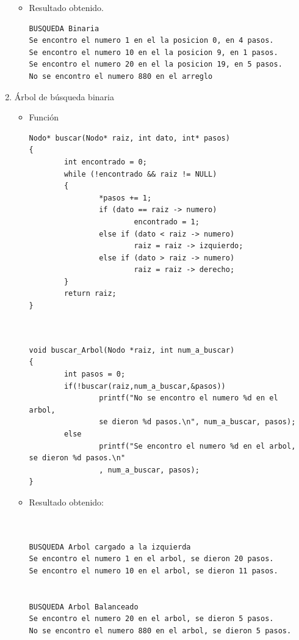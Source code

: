 \documentclass[a4paper,12pt]{article}
\begin{document}
\begin{enumerate}
\begin{itemize}
\item Resultado obtenido.

\begin{lstlisting}
BUSQUEDA Binaria
Se encontro el numero 1 en el la posicion 0, en 4 pasos.
Se encontro el numero 10 en el la posicion 9, en 1 pasos.
Se encontro el numero 20 en el la posicion 19, en 5 pasos.
No se encontro el numero 880 en el arreglo
\end{lstlisting}

\end{itemize}
\item Árbol de búsqueda binaria

\begin{itemize}
\item Función 

\begin{lstlisting}
Nodo* buscar(Nodo* raiz, int dato, int* pasos)
{
        int encontrado = 0;
        while (!encontrado && raiz != NULL)
        {
                *pasos += 1;
                if (dato == raiz -> numero)
                        encontrado = 1;
                else if (dato < raiz -> numero)
                        raiz = raiz -> izquierdo;
                else if (dato > raiz -> numero)
                        raiz = raiz -> derecho;
        }
        return raiz;
}
\end{lstlisting}

\lstset{basicstyle=\tiny}
\begin{lstlisting}


void buscar_Arbol(Nodo *raiz, int num_a_buscar)
{
        int pasos = 0;
        if(!buscar(raiz,num_a_buscar,&pasos))
                printf("No se encontro el numero %d en el arbol, 
                se dieron %d pasos.\n", num_a_buscar, pasos);
        else
                printf("Se encontro el numero %d en el arbol, se dieron %d pasos.\n"
                , num_a_buscar, pasos);
}

\end{lstlisting}

\item Resultado obtenido:

\begin{lstlisting}


BUSQUEDA Arbol cargado a la izquierda
Se encontro el numero 1 en el arbol, se dieron 20 pasos.
Se encontro el numero 10 en el arbol, se dieron 11 pasos.


BUSQUEDA Arbol Balanceado
Se encontro el numero 20 en el arbol, se dieron 5 pasos.
No se encontro el numero 880 en el arbol, se dieron 5 pasos.

\end{lstlisting}

\end{itemize}

\end{enumerate}
\end{document}
